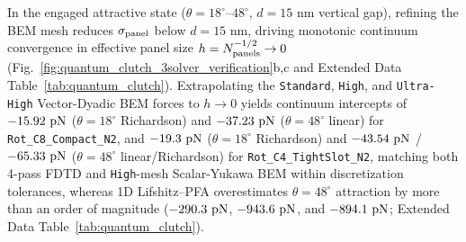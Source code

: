\documentclass[pdflatex,sn-nature]{sn-jnl}
\DeclareRobustCommand{\roundone}[1]{\fpeval{round(#1,1)}}
\DeclareRobustCommand{\roundtwo}[1]{\fpeval{round(#1,2)}}
\begin{document}
In the engaged attractive state ($\theta=18^\circ\text{--}48^\circ$, $d=15\text{ nm}$ vertical gap), refining the BEM mesh reduces $\sigma_{\rm panel}$ below $d=15\text{ nm}$, driving monotonic continuum convergence in effective panel size $h = N_{\rm panels}^{-1/2} \to 0$ (Fig.~\ref{fig:quantum_clutch_3solver_verification}b,c and Extended Data Table~\ref{tab:quantum_clutch}). Extrapolating the \texttt{Standard}, \texttt{High}, and \texttt{Ultra-High} Vector-Dyadic BEM forces to $h \to 0$ yields continuum intercepts of $\roundtwo{\RotCeightCompactNtwoBemThetaoneeightRichardsonFZPn}\text{ pN}$ ($\theta=18^\circ$ Richardson) and $\roundtwo{\RotCeightCompactNtwoBemThetafoureightContinuumFZPn}\text{ pN}$ ($\theta=48^\circ$ linear) for \texttt{Rot\_C8\_Compact\_N2}, and $\roundtwo{\RotCfourTightslotNtwoBemThetaoneeightRichardsonFZPn}\text{ pN}$ ($\theta=18^\circ$ Richardson) and $\roundtwo{\RotCfourTightslotNtwoBemThetafoureightContinuumFZPn}\text{ pN}$ / $\roundtwo{\RotCfourTightslotNtwoBemThetafoureightRichardsonFZPn}\text{ pN}$ ($\theta=48^\circ$ linear/Richardson) for \texttt{Rot\_C4\_TightSlot\_N2}, matching both 4-pass FDTD and \texttt{High}-mesh Scalar-Yukawa BEM within discretization tolerances, whereas 1D Lifshitz--PFA overestimates $\theta=48^\circ$ attraction by more than an order of magnitude ($\roundone{\RotCeightCompactNtwoHighThetaZerofoureightpzeroLifshitzPfaFZPn}\text{ pN}$, $\roundone{\RotCfourTightslotNtwoHighThetaZerofoureightpzeroLifshitzPfaFZPn}\text{ pN}$, and $\roundone{\RotConezeroFractalNthreeHighThetaZerofoureightpzeroLifshitzPfaFZPn}\text{ pN}$; Extended Data Table~\ref{tab:quantum_clutch}).
\end{document}
